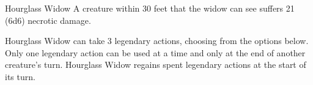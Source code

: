 \documentclass[10pt,a4paper,twoside,twocolumn,openany,bg=print,nodeprecatedcode]{dndbook}
\begin{document}
\begin{DndMonster}[float*=t]{Hourglass Widow}
A creature within 30 feet that the widow can see suffers 21 (6d6) necrotic damage.
\par
{}
Hourglass Widow can take 3 legendary actions, choosing from the options below. Only one legendary action can be used at a time and only at the end of another creature's turn. Hourglass Widow regains spent legendary actions at the start of its turn.
\begin{DndMonsterLegendaryActions}
\end{DndMonsterLegendaryActions}
\end{DndMonster}
\end{document}
